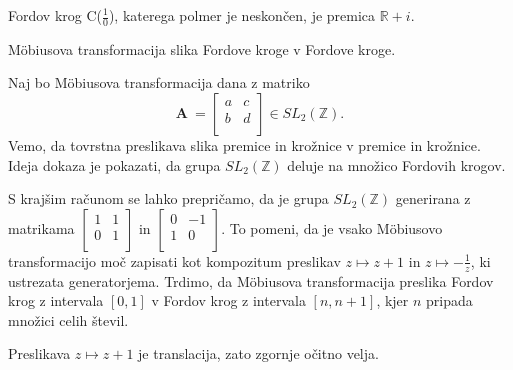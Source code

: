 \documentclass[mat1]{fmfdelo}
\begin{document}
\begin{definicija}
Fordov krog C($\frac{1}{0}$), katerega polmer je neskončen, je premica $\mathbb{R} + i$.
\end{definicija}

\begin{izrek}
\label{izr:MobDelovanje}
M\"{o}biusova transformacija slika Fordove kroge v Fordove kroge.
\end{izrek}

\begin{dokaz}
Naj bo M\"{o}biusova transformacija dana z matriko 
\[
\mathbf{A}\ =
\left[
\begin{array}{cc}
a & c \\
b & d \\
\end{array}
\right]
\in {SL}_{2}(\mathbb{Z}).
\]
Vemo, da tovrstna preslikava slika premice in krožnice v premice in krožnice. Ideja dokaza je pokazati, da grupa ${SL}_{2}(\mathbb{Z})$ deluje na množico Fordovih krogov.

S krajšim računom se lahko prepričamo, da je grupa ${SL}_{2}(\mathbb{Z})$ generirana z matrikama 
\(
\left[
\begin{array}{cc}
1 & 1 \\
0 & 1 \\
\end{array}
\right]
\)
in
\(
\left[
\begin{array}{cc}
0 & -1 \\
1 & 0 \\
\end{array}
\right]
\).
To pomeni, da je vsako M\"{o}biusovo transformacijo moč zapisati kot kompozitum preslikav $z \mapsto z+1$ in $z \mapsto -\frac{1}{z}$, ki ustrezata generatorjema. Trdimo, da M\"{o}biusova transformacija preslika Fordov krog z intervala $ [0,1]$ v Fordov krog z intervala $[n,n+1]$, kjer $n$ pripada množici celih števil. 

Preslikava $z \mapsto z+1$ je translacija, zato zgornje očitno velja.


\end{dokaz}
\end{document}
